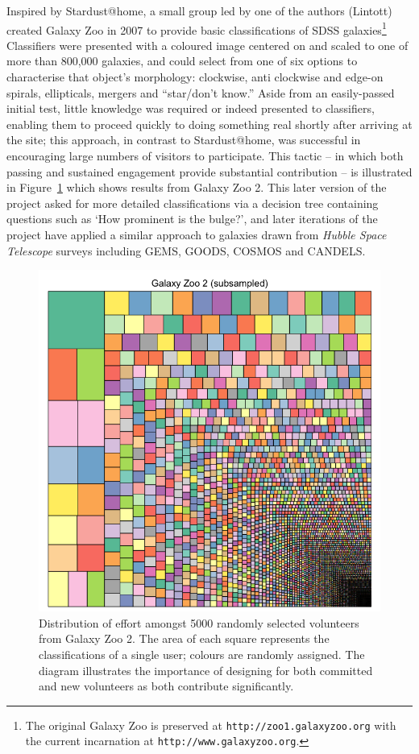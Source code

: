 \documentclass{ar2e}
\def\Fref#1{Figure~\ref{#1}\xspace}
\def\url#1{\texttt{#1}}
\begin{document}
Inspired by Stardust@home, a small group led by one of the authors (Lintott) created
Galaxy Zoo in 2007 to provide basic classifications of SDSS
galaxies\footnote{The original Galaxy Zoo is preserved at
\url{http://zoo1.galaxyzoo.org} with the current incarnation at
\url{http://www.galaxyzoo.org}.} Classifiers were presented with a coloured
image centered on and scaled to one of more than 800,000 galaxies, and could
select from one of six options to characterise that object's morphology: 
clockwise, anti clockwise and edge-on spirals,
ellipticals, mergers and ``star/don't know.'' Aside from  an easily-passed
initial test, little knowledge was required or indeed presented to classifiers,
enabling them to proceed quickly to doing something real 
shortly after arriving at the
site; this approach, in contrast to Stardust@home, was
successful in encouraging large numbers of visitors to participate. 
This tactic -- in which both passing and sustained engagement provide
substantial contribution -- is illustrated in \Fref{fig:gz2} which shows results from
Galaxy Zoo 2. This later version of the project asked for more detailed
classifications via a decision tree containing questions such as `How prominent
is the bulge?', and later iterations of the project have applied a similar
approach to galaxies drawn from \textit{Hubble Space Telescope} surveys including
\textsc{GEMS, GOODS, COSMOS} and \textsc{CANDELS}. 


\begin{figure}[!ht]
\centering\includegraphics[width=\linewidth]{figs/gz2squares.png}
\caption{Distribution of effort amongst 5000 randomly selected volunteers from
Galaxy Zoo 2. The area of each square represents the classifications of a single
user; colours are randomly assigned. The diagram illustrates the importance of
designing for both committed and new volunteers as both contribute significantly.}
\label{fig:gz2}
\end{figure}
\end{document}
